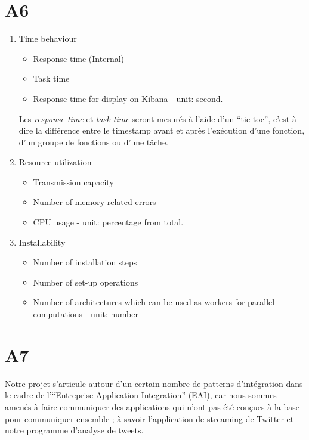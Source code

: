 \section{A6}
\label{sec:A6}
  \begin{enumerate}
    \item Time behaviour
      \begin{itemize}
        \item Response time (Internal)
        \item Task time
        \item Response time for display on Kibana - unit: second.
      \end{itemize} \bigskip

      Les \emph{response time} et \emph{task time} seront mesurés à l'aide d'un ``tic-toc'', c'est-à-dire la différence entre le timestamp avant et après l'exécution d'une fonction, d'un groupe de fonctions ou d'une tâche. \\

    \item Resource utilization
      \begin{itemize}
        \item Transmission capacity
        \item Number of memory related errors
        \item CPU usage - unit: percentage from total.
      \end{itemize} \bigskip

    \item Installability
      \begin{itemize}
        \item Number of installation steps
        \item Number of set-up operations
        \item Number of architectures which can be used as workers for parallel computations - unit: number
      \end{itemize} \bigskip
  \end{enumerate}

\section{A7}
  Notre projet s'articule autour d'un certain nombre de patterns d'intégration dans le cadre de l'``Entreprise Application Integration'' (EAI), car nous sommes amenés à faire communiquer des applications qui n'ont pas été conçues à la base pour communiquer ensemble ; à savoir l'application de streaming de Twitter et notre programme d'analyse de tweets. \\


